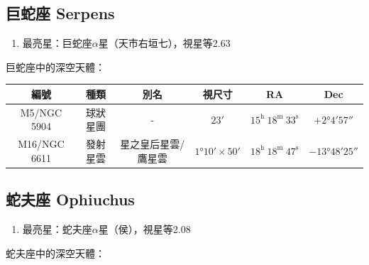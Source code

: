 \subsection{巨蛇座 Serpens}
\begin{enumerate}
    \item 最亮星：巨蛇座\(\alpha\)星（天市右垣七），視星等2.63
\end{enumerate}
巨蛇座中的深空天體：
\newline

\begin{center}
\begin{longtable}{c | c | c | c | c | c}
    編號 & 種類 & 別名 & 視尺寸 & RA & Dec \\
    \hline
    \endfirsthead


    \endfoot

    \endlastfoot

    M5/NGC 5904 & 球狀星團 & - & \(\ang{;23;}\) & \(15^\text{h }18^\text{m }33^\text{s}\) & \(+\ang{2;4;57}\) \\ %
    M16/NGC 6611 & 發射星雲 & 星之皇后星雲/鷹星雲 & \(\ang{1;10;}\times\ang{;50;}\) & \(18^\text{h }18^\text{m }47^\text{s}\) & \(-\ang{13;48;25}\) \\ %
\end{longtable}
\end{center}

\subsection{蛇夫座 Ophiuchus}
\begin{enumerate}
    \item 最亮星：蛇夫座\(\alpha\)星（侯），視星等2.08
\end{enumerate}
蛇夫座中的深空天體：
\newline

